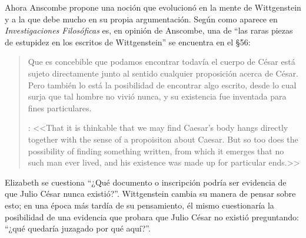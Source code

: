 Ahora Anscombe propone una noción que evolucionó en la mente de Wittgenstein y a la que debe mucho en su propia argumentación.
Según como aparece en \emph{Investigaciones Filosóficas} es, en opinión de Anscombe, una de \enquote{las raras piezas de estupidez en los escritos de Wittgenstein} se encuentra en el \S56: \blockquote[{\cite[89]{anscombe1981parmenides:humeandjulius}}: <<That it is thinkable that we may find Caesar's body hangs directly together with the sense of a propoisiton about Caesar. But so too does the possibility of finding something written, from which it emerges that no such man ever lived, and his existence was made up for particular ends.>>]{Que es concebible que podamos encontrar todavía el cuerpo de César está sujeto directamente junto al sentido cualquier proposición acerca de César. Pero también lo está la posibilidad de encontrar algo escrito, desde lo cual surja que tal hombre no vivió nunca, y su existencia fue inventada para fines particulares.} Elizabeth se cuestiona \enquote{¿Qué documento o inscripción podría ser evidencia de que Julio César nunca existió?}. Wittgenstein cambia su manera de pensar sobre esto; en una época más tardía de su pensamiento, él mismo cuestionaría la posibilidad de una evidencia que probara que Julio César no existió preguntando: \enquote{¿qué quedaría juzagado por qué aquí?}.


